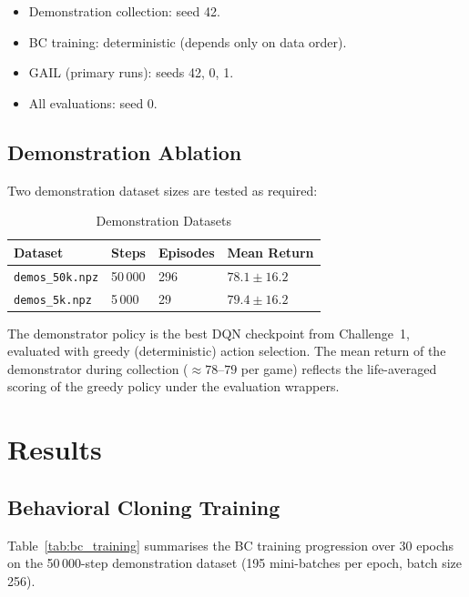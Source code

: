 \documentclass[conference]{IEEEtran}
\begin{document}
\begin{itemize}
  \item Demonstration collection: seed 42.
  \item BC training: deterministic (depends only on data order).
  \item GAIL (primary runs): seeds 42, 0, 1.
  \item All evaluations: seed 0.
\end{itemize}

\subsection{Demonstration Ablation}

Two demonstration dataset sizes are tested as required:

\begin{table}[h]
\centering
\caption{Demonstration Datasets}
\label{tab:demos}
\begin{tabular}{llll}
\toprule
\textbf{Dataset} & \textbf{Steps} & \textbf{Episodes} & \textbf{Mean Return} \\
\midrule
\texttt{demos\_50k.npz} & 50\,000 & 296 & $78.1 \pm 16.2$ \\
\texttt{demos\_5k.npz}  &  5\,000 &  29 & $79.4 \pm 16.2$ \\
\bottomrule
\end{tabular}
\end{table}

The demonstrator policy is the best DQN checkpoint from Challenge~1, evaluated with
greedy (deterministic) action selection.
The mean return of the demonstrator during collection ($\approx78$--$79$ per game) reflects
the life-averaged scoring of the greedy policy under the evaluation wrappers.

\section{Results}
\label{sec:results}

\subsection{Behavioral Cloning Training}

Table~\ref{tab:bc_training} summarises the BC training progression over 30 epochs on the
50\,000-step demonstration dataset (195 mini-batches per epoch, batch size 256).
\end{document}

